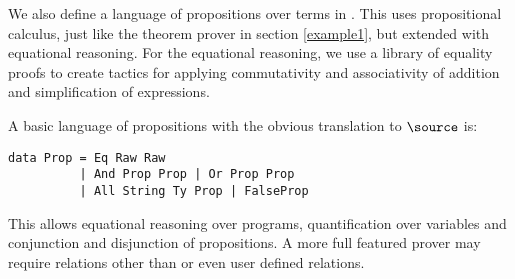 We also define a language of propositions over terms in \Funl{}.
This uses propositional calculus, just like the theorem prover in
section \ref{example1}, but extended with equational reasoning. For
the equational reasoning, we use a library of equality proofs to
create tactics for applying commutativity and associativity of
addition and simplification of expressions.

A basic language of propositions with the obvious translation to
$\source$ is:

\verb+data Prop = Eq Raw Raw+\\
\verb+          | And Prop Prop | Or Prop Prop+\\
\verb+          | All String Ty Prop | FalseProp+

This allows equational reasoning over \Funl{} programs, quantification
over variables and conjunction and disjunction of propositions. A more
full featured prover may require relations other than  or
even user defined relations.
